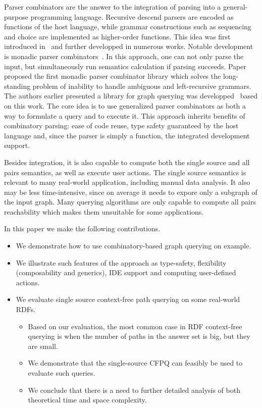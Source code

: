 Parser combinators are the answer to the integration of parsing into a general-purpose programming language.
Recursive descend parsers are encoded as functions of the host language, while grammar constructions such as sequencing and choice are implemented as higher-order functions. 
This idea was first introduced in~\cite{burge} and further developped in numerous works. 
Notable development is monadic parser combinators~\cite{hutton1996monadic}. 
In this approach, one can not only parse the input, but simultaneously run semantics calculation if parsing succeeds.
Paper~\cite{izmaylova2016practical} proposed the first monadic parser combinator library which solves the long-standing problem of inability to handle ambiguous and left-recursive grammars. 
The authors earlier presented a library for graph querying was developped~\cite{10.1145/3241653.3241655} based on this work. 
The core idea is to use generalized parser combinators as both a way to formulate a query and to execute it. 
This approach inherits benefits of combinatory parsing: ease of code reuse, type safety guaranteed by the host language and, since the parser is simply a function, the integrated development support. 

Besides integration, it is also capable to compute both the single source and all pairs semantics, as well as execute user actions.
The single source semantics is relevant to many real-world application, including manual data analysis. 
It also may be less time-intensive, since on average it needs to expore only a subgraph of the input graph. 
Many querying algorithms are only capable to compute all pairs reachability which makes them unsuitable for some applications. 

In this paper we make the following contributions.
\begin{itemize}
  \item We demonstrate how to use combinatory-based graph querying on example. 
  \item We illustrate such features of the approach as type-safety, flexibility (composability and generics), IDE support and computing user-defined actions.
  \item We evaluate single source context-free path querying on some real-world RDFs.
  \begin{itemize}
    \item Based on our evaluation, the most common case in RDF context-free querying is when the number of paths in the answer set is big, but they are small.  
    \item We demonstrate that the single-source CFPQ can feasibly be used to evaluate such queries. 
    \item We conclude that there is a need to further detailed analysis of both theoretical time and space complexity.
  \end{itemize}
\end{itemize}
